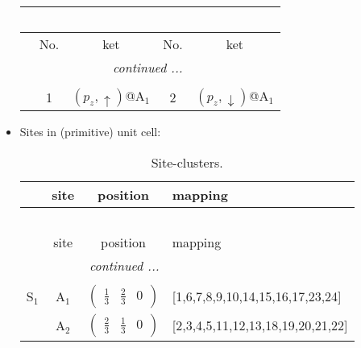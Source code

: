 \documentclass[fleqn,10pt,landscape]{article}
\begin{document}
\begin{itemize}
\begin{center}
\begin{longtable}{c|cc|cc}
\multicolumn{4}{l}{\tablename\ \thetable{}} \\
 \hline \hline
 & No. & ket & No. & ket \\ \hline \endhead

 \hline \hline
\multicolumn{4}{r}{\footnotesize\it continued ...} \\ \endfoot

 \hline \hline
\multicolumn{4}{r}{} \\ \endlastfoot

 & 1 & $(p_{z},\uparrow)$@A$_{1}$ & 2 & $(p_{z},\downarrow)$@A$_{1}$ \\
\end{longtable}
\end{center}

\item Sites in (primitive) unit cell:
\begin{center}
\renewcommand{\arraystretch}{1.3}
\begin{longtable}{cc|c|l}
\caption{Site-clusters.}
 \\
 \hline \hline
 & site & position & mapping \\ \hline \endfirsthead

\multicolumn{3}{l}{\tablename\ \thetable{}} \\
 \hline \hline
 & site & position & mapping \\ \hline \endhead

 \hline \hline
\multicolumn{3}{r}{\footnotesize\it continued ...} \\ \endfoot

 \hline \hline
\multicolumn{3}{r}{} \\ \endlastfoot

S$_{1}$ & A$_1$ & $\begin{pmatrix} \frac{1}{3} & \frac{2}{3} & 0 \end{pmatrix}$ & [1,6,7,8,9,10,14,15,16,17,23,24] \\
& A$_2$ & $\begin{pmatrix} \frac{2}{3} & \frac{1}{3} & 0 \end{pmatrix}$ & [2,3,4,5,11,12,13,18,19,20,21,22] \\
\end{longtable}
\end{center}


\end{itemize}
\end{document}
